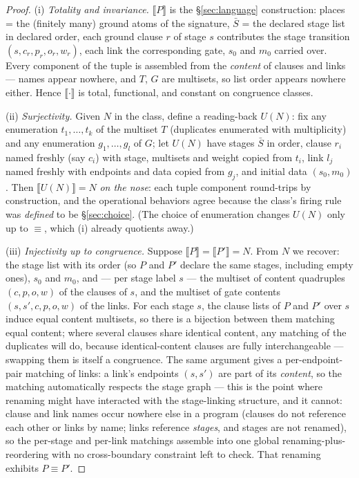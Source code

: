 \documentclass[11pt]{article}
\newcommand{\sem}[1]{\llbracket #1 \rrbracket}
\theoremstyle{plain}
\theoremstyle{definition}
\theoremstyle{remark}
\begin{document}
\begin{proof}
(i) \emph{Totality and invariance.} $\sem{P}$ is the
\S\ref{sec:language} construction: places = the (finitely many) ground
atoms of the signature, $\bar S$ = the declared stage list in declared
order, each ground clause $r$ of stage $s$ contributes the stage
transition $(s, c_r, p_r, o_r, w_r)$, each link the corresponding gate,
$s_0$ and $m_0$ carried over. Every component of the tuple is assembled
from the \emph{content} of clauses and links --- names appear nowhere,
and $T$, $G$ are multisets, so list order appears nowhere either. Hence
$\sem{\cdot}$ is total, functional, and constant on congruence classes.

(ii) \emph{Surjectivity.} Given $N$ in the class, define a reading-back
$U(N)$: fix any enumeration $t_1, \dots, t_k$ of the multiset $T$
(duplicates enumerated with multiplicity) and any enumeration
$g_1, \dots, g_l$ of $G$; let $U(N)$ have stages $\bar S$ in order,
clause $r_i$ named freshly (say $c_i$) with stage, multisets and weight
copied from $t_i$, link $l_j$ named freshly with endpoints and data
copied from $g_j$, and initial data $(s_0, m_0)$. Then
$\sem{U(N)} = N$ \emph{on the nose}: each tuple component round-trips
by construction, and the operational behaviors agree because the
class's firing rule was \emph{defined} to be \S\ref{sec:choice}. (The
choice of enumeration changes $U(N)$ only up to $\equiv$, which (i)
already quotients away.)

(iii) \emph{Injectivity up to congruence.} Suppose
$\sem{P} = \sem{P'} = N$. From $N$ we recover: the stage list with its
order (so $P$ and $P'$ declare the same stages, including empty ones),
$s_0$ and $m_0$, and --- per stage label $s$ --- the multiset of
content quadruples $(c, p, o, w)$ of the clauses of $s$, and the
multiset of gate contents $(s, s', c, p, o, w)$ of the links. For each
stage $s$, the clause lists of $P$ and $P'$ over $s$ induce equal
content multisets, so there is a bijection between them matching equal
content; where several clauses share identical content, any matching of
the duplicates will do, because identical-content clauses are fully
interchangeable --- swapping them is itself a congruence. The same
argument gives a per-endpoint-pair matching of links: a link's
endpoints $(s, s')$ are part of its \emph{content}, so the matching
automatically respects the stage graph --- this is the point where
renaming might have interacted with the stage-linking structure, and it
cannot: clause and link names occur nowhere else in a program (clauses
do not reference each other or links by name; links reference
\emph{stages}, and stages are not renamed), so the per-stage and
per-link matchings assemble into one global renaming-plus-reordering
with no cross-boundary constraint left to check. That renaming exhibits
$P \equiv P'$.
\end{proof}
\end{document}
